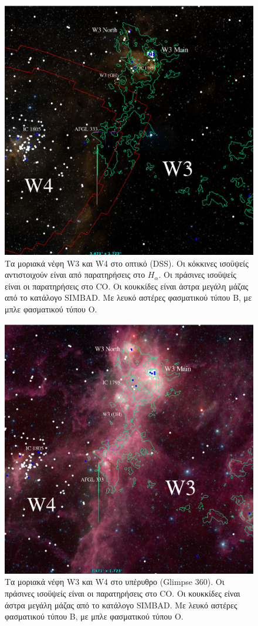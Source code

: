 \documentclass[a4paper,12pt]{memoir}
\begin{document}
\begin{figure}[hb]
	\centering
	\includegraphics[width=13cm]{images/optical-Ha-CO-OB.ps}
	\caption{Τα μοριακά νέφη W3 και W4 στο οπτικό (DSS). Οι κόκκινες ισοϋψείς αντιστοιχούν είναι από παρατηρήσεις στο $H_{\alpha}$. Οι πράσινες ισοϋψείς είναι οι παρατηρήσεις στο CO. Οι κουκκίδες είναι άστρα μεγάλη μάζας από το κατάλογο SIMBAD. Με λευκό αστέρες φασματικού τύπου B, με μπλε φασματικού τύπου O.}
\end{figure}


\begin{figure}[hb]
	\centering
	\includegraphics[width=13cm]{images/infrared-CO-OB.ps}
	\caption{Τα μοριακά νέφη W3 και W4 στο υπέρυθρο (Glimpse 360). Οι πράσινες ισοϋψείς είναι οι παρατηρήσεις στο CO. Οι κουκκίδες είναι άστρα μεγάλη μάζας από το κατάλογο SIMBAD. Με λευκό αστέρες φασματικού τύπου B, με μπλε φασματικού τύπου O.}
\end{figure}
\end{document}
